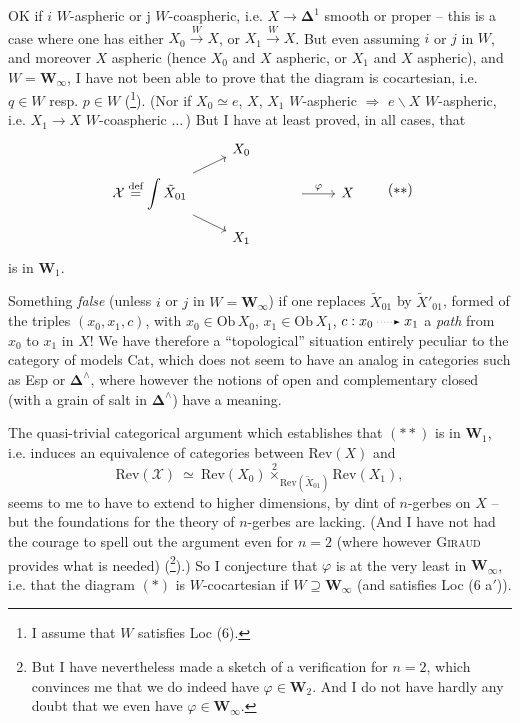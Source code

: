 \documentclass[11pt]{article}
\newcommand{\msp}[1]{\marginpar{\footnotesize [#1]}}
\newcommand{\dotto}{\mathrel{\tikz[baseline=-0.5ex]\draw[dotted,-latex] (0,0)--(1.6em,0);}}
\begin{document}
OK if $i$ $W$-aspheric or j $W$-coaspheric, i.e. $X \longrightarrow \boldsymbol{\Delta}^1$ smooth or proper -- this is a case where one has either $X_0 \xrightarrow{W} X$, or $X_1 \xrightarrow{W} X$. But even assuming $i$ or $j$ in $W$, and moreover $X$ aspheric (hence $X_0$ and $X$ aspheric, or $X_1$ and $X$ aspheric), and $W = \mathbf{W}_\infty$, I have not been able to prove that the diagram is cocartesian, i.e. $q \in W$ resp. $p \in W$ (\footnote[9]{I assume that $W$ satisfies Loc (6).}). (Nor if $X_0 \simeq e$, $X$, $X_1$ $W$-aspheric $\Longrightarrow$ $e\backslash X$ $W$-aspheric, i.e. $X_1 \longrightarrow X$ $W$-coaspheric $\ldots$\,) But I have at least proved, in all cases, that %
\[
\begin{tikzcd}[row sep=small]
 & X_0 & & \\
\mathcal{X} \overset{\text{def}}{=} \displaystyle\int \tilde{X}_{01} \arrow[ur] \arrow[dr] & & {} \arrow[r, "\varphi"] & X \\
 & X_1 & &
\end{tikzcd}
\tag*{$(**)$} %
\]
is in $\mathbf{W}_1$.

Something \textit{false} (unless $i$ or $j$ in $W = \mathbf{W}_\infty$) if one replaces $\tilde{X}_{01}$ by $\tilde{X}'_{01}$, formed of the triples $(x_0, x_1, c)$, with $x_0 \in \mathrm{Ob}\,X_0$, $x_1 \in \mathrm{Ob}\,X_1$, $c : x_0 \dotto x_1$ a \textit{path} from $x_0$ to $x_1$ in $X$! We have
\msp{page 18}therefore a ``topological'' situation entirely peculiar to the category of models Cat, which does not seem to have an analog in categories such as Esp or $\boldsymbol{\Delta}^\wedge$, where however the notions of open and complementary closed (with a grain of salt in $\boldsymbol{\Delta}^\wedge$) have a meaning.

The quasi-trivial categorical argument which establishes that $(**)$ is in $\mathbf{W}_1$, i.e. induces an equivalence of categories between $\mathrm{Rev}(X)$ and
\[ \mathrm{Rev}(\mathcal{X}) \ \simeq \ \mathrm{Rev}(X_0) \overset{2}{\times}_{\mathrm{Rev}(\tilde{X}_{01})} \mathrm{Rev}(X_1), \]
seems to me to have to extend to higher dimensions, by dint of $n$-gerbes on $X$ -- but the foundations for the theory of $n$-gerbes are lacking. (And I have not had the courage to spell out the argument even for $n = 2$ (where however \textsc{Giraud} provides what is needed) (\footnote[10]{But I have nevertheless made a sketch of a verification for $n = 2$, which convinces me that we do indeed have $\varphi \in \mathbf{W}_2$. And I do not have hardly any doubt that we even have $\varphi \in \mathbf{W}_\infty$.}).) So I conjecture that $\varphi$ is at the very least in $\mathbf{W}_\infty$, i.e. that the diagram $(*)$ is $W$-cocartesian if $W \supseteq \mathbf{W}_\infty$ (and satisfies Loc (6 a$'$)). %
\end{document}
